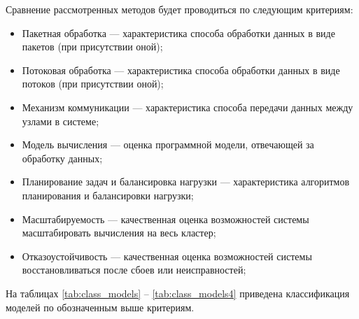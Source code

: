 
Сравнение рассмотренных методов будет проводиться по следующим критериям:
\begin{itemize}
    \item Пакетная обработка --- характеристика способа обработки данных в виде пакетов (при присутствии оной);
    \item Потоковая обработка --- характеристика способа обработки данных в виде потоков (при присутствии оной);
    \item Механизм коммуникации --- характеристика способа передачи данных между узлами в системе;
    \item Модель вычисления --- оценка программной модели, отвечающей за обработку данных;
    \item Планирование задач и балансировка нагрузки --- характеристика алгоритмов планирования и балансировки нагрузки;
    \item Масштабируемость --- качественная оценка возможностей системы масштабировать вычисления на весь кластер;
    \item Отказоустойчивость --- качественная оценка возможностей системы восстановливаться после сбоев или неисправностей;
\end{itemize}

На таблицах \ref{tab:class_models} -- \ref{tab:class_models4} приведена классификация моделей по обозначенным выше критериям.

